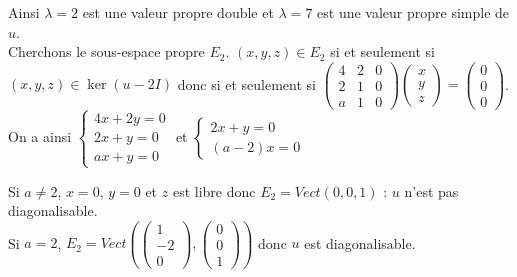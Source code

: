 \documentclass[a4paper,10pt]{book} %
\begin{document}
Ainsi $\lambda=2$ est une valeur propre double et $\lambda=7$ est une valeur propre simple de $u$.\\

Cherchons le sous-espace propre $E_2$. $(x,y,z)\in E_2$ si et seulement si $(x,y,z)\in \ker(u-2I)$ donc si et seulement si $\begin{pmatrix}
4&2&0\\2&1&0\\a&1&0
\end{pmatrix}\begin{pmatrix}
x\\y\\z
\end{pmatrix}=\begin{pmatrix}
0\\0\\0
\end{pmatrix}$.\\

On a ainsi $\left\{\begin{array}{c}
4x+2y=0\\2x+y=0\\ax+y=0
\end{array}\right.$ et $\left\{\begin{array}{rcl}
2x+y=0\\(a-2)x=0
\end{array}\right.$

Si $a\neq 2$, $x=0$, $y=0$ et $z$ est libre donc $E_2=Vect(0,0,1)$ : $u$ n'est pas diagonalisable.\\
Si $a=2$, $E_2=Vect(\begin{pmatrix}
1\\-2\\0
\end{pmatrix},\begin{pmatrix}
0\\0\\1
\end{pmatrix})$ donc $u$ est diagonalisable.\\
\end{document}

